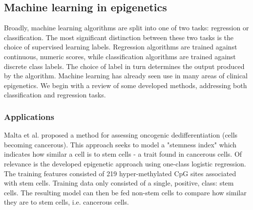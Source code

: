 \documentclass{article} %
\begin{document}


\subsection{Machine learning in epigenetics}
Broadly, machine learning algorithms are split into one of two tasks: regression or classification. The most significant distinction between these two tasks is the choice of supervised learning labels. Regression algorithms are trained against continuous, numeric scores, while classification algorithms are trained against discrete class labels. The choice of label in turn determines the output produced by the algorithm.
Machine learning has already seen use in many areas of clinical epigenetics. We begin with a review of some developed methods, addressing both classification and regression tasks.

\subsubsection{Applications} \label{sec:ml-examples}

Malta et al. \cite{malta2018machine} proposed a method for assessing oncogenic dedifferentiation (cells becoming cancerous). This approach seeks to model a "stemness index" which indicates how similar a cell is to stem cells - a trait found in cancerous cells. Of relevance is the developed epigenetic approach using one-class logistic regression. The training features consisted of 219 hyper-methylated CpG sites associated with stem cells. Training data only consisted of a single, positive, class: stem cells. The resulting model can then be fed non-stem cells to compare how similar they are to stem cells, i.e. cancerous cells.
\end{document}
